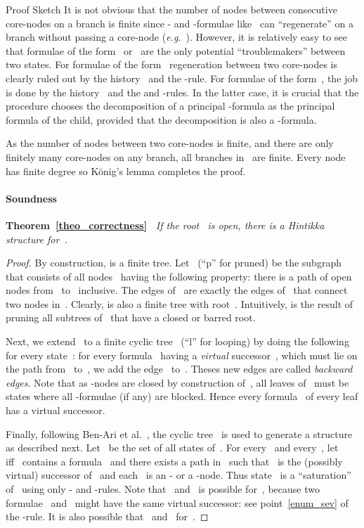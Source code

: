 \documentclass{entcs}
\newcommand{\eg}{\emph{e.g.}}
\newcommand{\fea}{}
\newcommand{\fean}{}
\newcommand{\trid}{}
\newcommand{\trar}{}
\newcommand{\trero}{}
\newcommand{\trert}{}
\newcommand{\trea}{}
\begin{document}
\begin{center}
\begin{proof*}{Proof Sketch}
  It is not obvious
  that the number of nodes between consecutive core-nodes on a branch is finite
  since -
  and -formulae like~
  can ``regenerate'' on a branch without passing a core-node
  (\eg{}~).
  However, it is relatively easy to see
  that formulae of the form~ or~
  are the only potential ``troublemakers'' between two states.
  For formulae of the form~
  regeneration between two core-nodes is clearly ruled out
  by the history~ and the \trar{}-rule.
  For formulae of the form~,
  the job is done by the history~ and the \trero{} and \trert{}-rules.
  In the latter case, it is crucial
  that the procedure chooses the decomposition of a principal \fean{}-formula
  as the principal formula of the child,
  provided that the decomposition is also a \fean{}-formula.

  As the number of nodes between two core-nodes is finite,
  and there are only finitely many core-nodes on any branch,
  all branches in~ are finite.
  Every node has finite degree
  so K\"onig's lemma completes the proof.
\end{proof*}

\paragraph{\bf Soundness}

\noindent{}\textbf{Theorem~\ref{theo_correctness}\ }
\emph{If the root~ is open, there is a Hintikka structure for~.}
\begin{proof}
  By construction,  is a finite tree.
  Let~ (``p'' for pruned)
  be the subgraph that consists of all nodes~ having the following property:
  there is a path of open nodes from~ to~ inclusive.
  The edges of~ are exactly the edges of~ that connect two nodes in~.
  Clearly,  is also a finite tree with root~.
  Intuitively,  is the result of pruning all subtrees of~ that have a closed or barred root.

  Next, we extend~ to a finite cyclic tree~ (``l'' for looping)
  by doing the following for every state~:
  for every formula~ having a \emph{virtual} successor~,
  which must lie on the path from~ to~,
  we add the edge~ to~.
  Theses new edges are called \emph{backward edges}.
  Note that as \trid{}-nodes are closed by construction of~,
  all leaves of~ must be states where all \fea{}-formulae (if any) are blocked.
  Hence every formula~ of every leaf has a virtual successor.

  Finally, following Ben-Ari et al.~\cite{ben-ari-pnueli-manna-branching},
  the cyclic tree~ is used to generate a structure~
  as described next.
  Let~ be the set of all states of~.
  For every~ and every~,
  let~ iff~ contains a formula~
  and there exists a path  in~
  such that~ is the (possibly virtual) successor of~
  and each~ is an - or a -node.
  Thus state~ is a ``saturation'' of~ using only - and -rules.
  Note that~ and~ is possible for~,
  because two formulae~ and~ might have the same virtual successor:
  see point~\ref{enum_sev} of the \trea{}-rule.
  It is also possible that~ and~ for~.


\end{proof}
\end{center}
\end{document}

